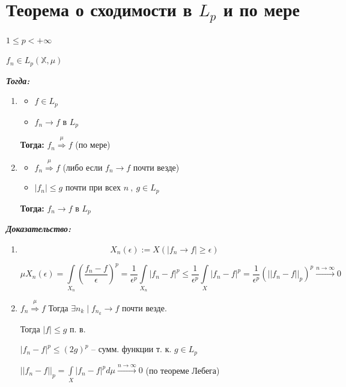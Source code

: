 \documentclass[paper=a4, fontsize=17pt]{article}
\begin{document}
\section{Теорема о сходимости в $L_p$ и по мере}
$ 1 \leq p < +\infty $

$ f_n \in L_p(\mathbb{X}, \mu)$

\textbf{\emph{Тогда:}}

\begin{enumerate}
	
	
	\item \begin{itemize}
		\item $ f \in L_p $
		\item $ f_n \rightarrow f $ в $ L_p $
	\end{itemize} 
	\textbf{Тогда:} $ f_n \stackrel{\mu}{\Rightarrow} f $ (по мере)
		
	\item \begin{itemize}
		\item $ f_n \stackrel{\mu}{\Rightarrow} f $ (либо если $ f_n \rightarrow f $  почти везде)
		\item $ |f_n| \leq g $ почти при всех $ n ~ , ~ g \in L_p $
	\end{itemize} 
	\textbf{Тогда:} $ f_n \rightarrow f $ в $ L_p $
\end{enumerate}

\textbf{\emph{Доказательство:}}

\begin{enumerate}
	\item $$ X_n(\epsilon) := X(|f_n \rightarrow f| \geq \epsilon) $$
	
	$$ \mu X_n(\epsilon) = \int\limits_{X_n} (\frac{f_n - f}{\epsilon})^p  = 
	\frac{1}{\epsilon^p} \int\limits_{X_n} |f_n - f|^p \leq 
	\frac{1}{\epsilon^p} \int\limits_{X} |f_n - f|^p = 
	\frac{1}{\epsilon^p} (||f_n - f||_p)^p \stackrel{n \rightarrow \infty}{\rightarrow} 0$$
	
	\item $ f_n \stackrel{\mu}{\Rightarrow} f $ Тогда $ \exists n_k \mid f_{n_k} \rightarrow f $ почти везде. 
	
	Тогда $ |f| \leq g $ п. в. 
	
	$ |f_n - f|^p \leq (2g)^p $ -- сумм. функции т. к. $ g \in L_p $
	
	$ ||f_n - f||_p = \int\limits_{X} |f_n - f|^p d\mu \stackrel{n \rightarrow \infty}{\rightarrow} 0 $ (по теореме Лебега)
	
\end{enumerate}
\end{document}
